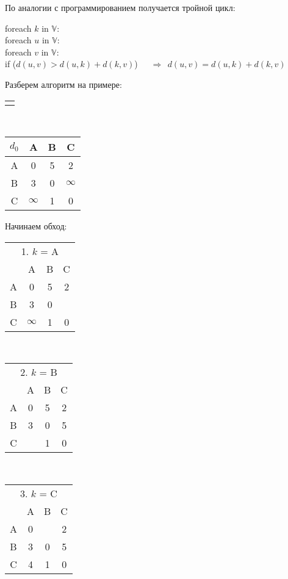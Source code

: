 \documentclass[russian]{lecture-notes}
\newenvironment{tabulargraph}[3]
{
	\begin{tabular}{c}
		\begin{tikzpicture}[every node/.style={#1}, every edge/.style={#2}, every path/.style={#3}]
	}
	{
		\end{tikzpicture}
	\end{tabular}
	~~~
}
\begin{document}
	По аналогии с программированием получается тройной цикл:
	\begin{center}
		foreach $k$ in $\mathbb{V}$:\\
		\qquad foreach $u$ in $\mathbb{V}$:\\
		\qquad \qquad foreach $v$ in $\mathbb{V}$:\\[1ex]
		\qquad \qquad \qquad if ($d(u,v) > d(u,k) + d(k, v)$)~~~$\Rightarrow~~d(u,v) = d(u,k) + d(k, v)$
	\end{center}
	\begin{example}
		Разберем алгоритм на примере:
		\begin{center}
			\begin{tabulargraph}{circle, thick, draw = black}{thick, draw = black}{->}
				\node (a) at (0,0){A};
				\node (b) at (1.8, -0.5){B};
				\node (c) at (1.5, 1.2){C};
				
				\path (a) edge[bend right = 15] node[below, draw = none, scale = 0.8]{5} (b);
				\path (a) edge node[above left, draw = none, scale = 0.8]{2} (c);
				\path (c) edge node[right, draw = none, scale = 0.8]{1} (b);
				\path (b) edge[bend right = 15] node[above, draw = none, scale = 0.8]{3} (a);
			\end{tabulargraph}
			\begin{tabular}{c|ccc}
				$d_0$&A&B&C\\ \hline
				A&0&5&2\\
				B&3&0&$\infty$\\
				C&$\infty$&1&0
			\end{tabular}
		\end{center}
		Начинаем обход:
		\begin{center}
			\begin{tabular}{c|ccc}
				\multicolumn{4}{c}{1. $k$ = A}\\[2ex]
				&A&B&C\\ \hline
				A&0&5&2\\
				B&3&0&\framebox{5}\\
				C&$\infty$&1&0
			\end{tabular}
			~~~~
			\begin{tabular}{c|ccc}
				\multicolumn{4}{c}{2. $k$ = B}\\[2ex]
				&A&B&C\\ \hline
				A&0&5&2\\
				B&3&0&5\\
				C&\framebox{4}&1&0
			\end{tabular}
			~~~~
			\begin{tabular}{c|ccc}
				\multicolumn{4}{c}{3. $k$ = C}\\[2ex]
				&A&B&C\\ \hline
				A&0&\framebox{3}&2\\
				B&3&0&5\\
				C&4&1&0
			\end{tabular}
		\end{center}
	\end{example}
	
\end{document}

